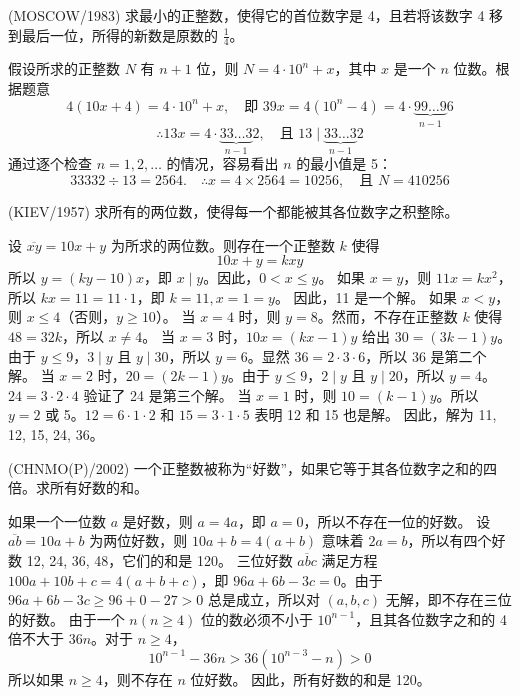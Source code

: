 \begin{questions}
    \question (MOSCOW/1983) 求最小的正整数，使得它的首位数字是 4，且若将该数字 4 移到最后一位，所得的新数是原数的 $\frac{1}{4}$。

\begin{solution}
假设所求的正整数 $N$ 有 $n + 1$ 位，则 $N = 4 \cdot 10^n + x$，其中 $x$ 是一个 $n$ 位数。根据题意
\[
4(10x + 4) = 4 \cdot 10^n + x, \quad \text{即 } 39x = 4(10^n - 4) = 4 \cdot \underbrace{99 \dots 9}_{n-1} 6
\]
\[
\therefore 13x = 4 \cdot \underbrace{33 \dots 3}_{n-1} 2, \quad \text{且 } 13 \mid \underbrace{33 \dots 3}_{n-1} 2
\]
通过逐个检查 $n = 1, 2, \dots$ 的情况，容易看出 $n$ 的最小值是 5：
\[
33332 \div 13 = 2564. \quad \therefore x = 4 \times 2564 = 10256, \quad \text{且 } N = 410256
\]
\end{solution}

\question (KIEV/1957) 求所有的两位数，使得每一个都能被其各位数字之积整除。

\begin{solution}
设 $\overline{xy} = 10x + y$ 为所求的两位数。则存在一个正整数 $k$ 使得
\[
10x + y = kxy
\]
所以 $y = (ky - 10)x$，即 $x \mid y$。因此，$0 < x \leq y$。
如果 $x = y$，则 $11x = kx^2$，所以 $kx = 11 = 11 \cdot 1$，即 $k = 11, x = 1 = y$。
因此，11 是一个解。
如果 $x < y$，则 $x \leq 4$（否则，$y \geq 10$）。
当 $x = 4$ 时，则 $y = 8$。然而，不存在正整数 $k$ 使得 $48 = 32k$，所以 $x \neq 4$。
当 $x = 3$ 时，$10x = (kx - 1)y$ 给出 $30 = (3k - 1)y$。由于 $y \leq 9$，$3 \mid y$ 且 $y \mid 30$，所以 $y = 6$。显然 $36 = 2 \cdot 3 \cdot 6$，所以 36 是第二个解。
当 $x = 2$ 时，$20 = (2k - 1)y$。由于 $y \leq 9$，$2 \mid y$ 且 $y \mid 20$，所以 $y = 4$。$24 = 3 \cdot 2 \cdot 4$ 验证了 24 是第三个解。
当 $x = 1$ 时，则 $10 = (k - 1)y$。所以 $y = 2$ 或 5。$12 = 6 \cdot 1 \cdot 2$ 和 $15 = 3 \cdot 1 \cdot 5$ 表明 12 和 15 也是解。
因此，解为 11, 12, 15, 24, 36。
\end{solution}

\question (CHNMO(P)/2002) 一个正整数被称为“好数”，如果它等于其各位数字之和的四倍。求所有好数的和。

\begin{solution}
如果一个一位数 $a$ 是好数，则 $a = 4a$，即 $a = 0$，所以不存在一位的好数。
设 $\overline{ab} = 10a + b$ 为两位好数，则 $10a + b = 4(a + b)$ 意味着 $2a = b$，所以有四个好数 12, 24, 36, 48，它们的和是 120。
三位好数 $\overline{abc}$ 满足方程 $100a + 10b + c = 4(a + b + c)$，即 $96a + 6b - 3c = 0$。由于 $96a + 6b - 3c \geq 96 + 0 - 27 > 0$ 总是成立，所以对 $(a, b, c)$ 无解，即不存在三位的好数。
由于一个 $n (n \geq 4)$ 位的数必须不小于 $10^{n-1}$，且其各位数字之和的 4 倍不大于 $36n$。对于 $n \geq 4$，
\[
10^{n-1} - 36n > 36(10^{n-3} - n) > 0
\]
所以如果 $n \geq 4$，则不存在 $n$ 位好数。
因此，所有好数的和是 120。
\end{solution}


\end{questions}
